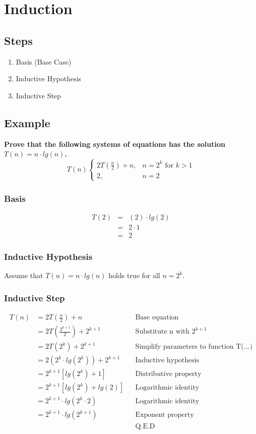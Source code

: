 \section{Induction}

\subsection*{Steps}
\begin{enumerate}
	\item Basis (Base Case)
	\item Inductive Hypothesis
	\item Inductive Step
\end{enumerate}

\subsection{Example}
\textbf{Prove that the following systems of equations has the solution $T(n) = n \cdot lg(n)$.}
$$
T(n) \begin{cases}
	2T(\frac{n}{2}) + n, & n = 2^k \mbox{ for } k > 1\\
	2, & n = 2
\end{cases}
$$

\subsubsection*{Basis}
\begin{eqnarray*}
T(2) &=& (2) \cdot lg(2)\\
	&=& 2 \cdot 1\\
	&=& 2
\end{eqnarray*}

\subsubsection*{Inductive Hypothesis}
Assume that $T(n) = n \cdot lg(n)$ holds true for all $n = 2^k$.

\subsubsection*{Inductive Step}
\begin{align*}
T(n)	&=	2T(\frac{n}{2}) + n						&& \text{Base equation}\\
		&= 	2T(\frac{2^{k+1}}{2}) + 2^{k+1}			&& \text{Substitute n with } 2^{k+1}\\
		&= 	2T(2^{k}) + 2^{k+1}						&& \text{Simplify parameters to function T(...)}\\
		&=	2(2^k \cdot lg(2^k)) + 2^{k+1}			&& \text{Inductive hypothesis}\\
		&=	2^{k+1} \left[ lg(2^k) + 1 \right]		&& \text{Distributive property}\\
		&=  2^{k+1} \left[ lg(2^k) + lg(2) \right]  && \text{Logarithmic identity}\\
		&= 	2^{k+1} \cdot lg(2^k \cdot 2)			&& \text{Logarithmic identity}\\
		&=  2^{k+1} \cdot lg(2^{k+1})				&& \text{Exponent property}\\
		&											&& \text{Q.E.D}
\end{align*}

